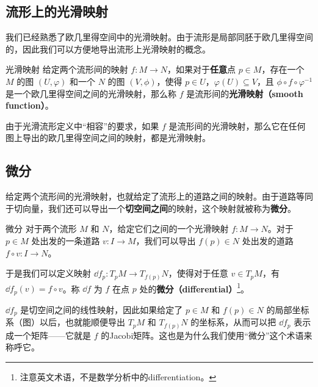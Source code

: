 

\subsection{流形上的光滑映射}

我们已经熟悉了欧几里得空间中的光滑映射。由于流形是局部同胚于欧几里得空间的，因此我们可以方便地导出流形上光滑映射的概念。

\begin{definition}{光滑映射}
给定两个流形间的映射 $f:M\to N$，如果对于\textbf{任意}点 $p\in M$，存在一个 $M$ 的图 $(U, \varphi)$ 和一个 $N$ 的图 $(V, \phi)$，使得 $p\in U$，$\varphi(U)\subseteq V$，且 $\phi\circ f\circ\varphi^{-1}$ 是一个欧几里得空间之间的光滑映射，那么称 $f$ 是流形间的\textbf{光滑映射（smooth function）}。
\end{definition}

由于光滑流形定义中“相容”的要求，如果 $f$ 是流形间的光滑映射，那么它在任何图上导出的欧几里得空间之间的映射，都是光滑映射。


\subsection{微分}

给定两个流形间的光滑映射，也就给定了流形上的道路之间的映射。由于道路等同于切向量，我们还可以导出一个\textbf{切空间之间}的映射，这个映射就被称为\textbf{微分}。

\begin{definition}{微分}
对于两个流形 $M$ 和 $N$，给定它们之间的一个光滑映射 $f:M\to N$。对于 $p\in M$ 处出发的一条道路 $v:I\to M$，我们可以导出 $f(p)\in N$ 处出发的道路 $f\circ v:I\to N$。

于是我们可以定义映射 $\dd f_p: T_pM\to T_{f(p)}N$，使得对于任意 $v\in T_pM$，有 $\dd f_p(v)=f\circ v$。称 $\dd f$ 为 $f$ 在点 $p$ 处的\textbf{微分（differential）}\footnote{注意英文术语，不是数学分析中的differentiation。}。
\end{definition}

$\dd f_p$ 是切空间之间的线性映射，因此如果给定了 $p\in M$ 和 $f(p)\in N$ 的局部坐标系（图）以后，也就能顺便导出 $T_pM$ 和 $T_{f(p)}N$ 的坐标系，从而可以把 $\dd f_p$ 表示成一个矩阵——它就是 $f$ 的Jacobi矩阵。这也是为什么我们使用“微分”这个术语来称呼它。

